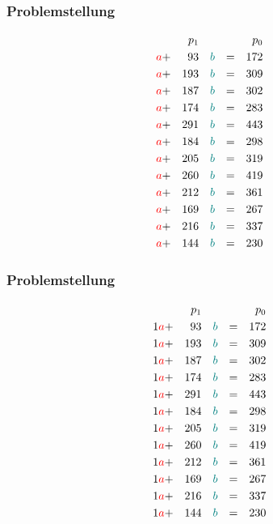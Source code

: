 \documentclass{beamer}
\begin{document}
\begin{frame}
    \frametitle{Problemstellung}
    \small
    \begin{alignat*}{5}
           && p_1 &&     && && p_0 \\
        {\color{red}a} +&& 93  &&   {\color{teal}b} &&=&& 172 \\
        {\color{red}a} +&& 193 &&   {\color{teal}b} &&=&& 309 \\
        {\color{red}a} +&& 187 &&   {\color{teal}b} &&=&& 302 \\
        {\color{red}a} +&& 174 &&   {\color{teal}b} &&=&& 283 \\
        {\color{red}a} +&& 291 &&   {\color{teal}b} &&=&& 443 \\
        {\color{red}a} +&& 184 &&   {\color{teal}b} &&=&& 298 \\
        {\color{red}a} +&& 205 &&   {\color{teal}b} &&=&& 319 \\
        {\color{red}a} +&& 260 &&   {\color{teal}b} &&=&& 419 \\
        {\color{red}a} +&& 212 &&   {\color{teal}b} &&=&& 361 \\
        {\color{red}a} +&& 169 &&   {\color{teal}b} &&=&& 267 \\
        {\color{red}a} +&& 216 &&   {\color{teal}b} &&=&& 337 \\
        {\color{red}a} +&& 144 &&   {\color{teal}b} &&=&& 230
    \end{alignat*}
\end{frame}

\begin{frame}
    \frametitle{Problemstellung}
    \small
    \begin{alignat*}{5}
           && p_1 &&     && && p_0 \\
        1{\color{red}a} +&& 93  &&   {\color{teal}b} &&=&& 172 \\
        1{\color{red}a} +&& 193 &&   {\color{teal}b} &&=&& 309 \\
        1{\color{red}a} +&& 187 &&   {\color{teal}b} &&=&& 302 \\
        1{\color{red}a} +&& 174 &&   {\color{teal}b} &&=&& 283 \\
        1{\color{red}a} +&& 291 &&   {\color{teal}b} &&=&& 443 \\
        1{\color{red}a} +&& 184 &&   {\color{teal}b} &&=&& 298 \\
        1{\color{red}a} +&& 205 &&   {\color{teal}b} &&=&& 319 \\
        1{\color{red}a} +&& 260 &&   {\color{teal}b} &&=&& 419 \\
        1{\color{red}a} +&& 212 &&   {\color{teal}b} &&=&& 361 \\
        1{\color{red}a} +&& 169 &&   {\color{teal}b} &&=&& 267 \\
        1{\color{red}a} +&& 216 &&   {\color{teal}b} &&=&& 337 \\
        1{\color{red}a} +&& 144 &&   {\color{teal}b} &&=&& 230
    \end{alignat*}
\end{frame}
\end{document}
